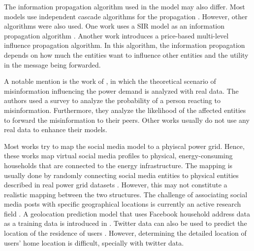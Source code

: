 The information propagation algorithm used in the model may also differ.
Most models use independent cascade algorithms for the propagation
\cite{raman2020weaponizing} \cite{pan2017threat}
\cite{nguyen2019vulnerability}. 
However, other algorithms were also used. One work uses a SIR 
model as an information propagation algorithm 
\cite{jamalzadeh2022protecting}. Another work 
\cite{vulnerabilityanalysis} introduces a price-based multi-level 
influence propagation algorithm. In this algorithm, the information
propagation depends on how much the entities want to influence other
entities and the utility in the message being forwarded. 

A notable mention is the work of \cite{raman2020weaponizing},
in which the theoretical scenario of misinformation influencing 
the power demand is analyzed with real data. The authors 
used a survey to analyze the probability 
of a person reacting to misinformation.
Furthermore, they analyze the likelihood of the affected entities 
to forward the misinformation to their
peers. Other works usually do not use any real data to 
enhance their models.

Most works try to map the social media model to 
a phyiscal power grid. Hence, these works map virtual social 
media profiles to physical, energy-consuming 
households that are connected to the energy infrastructure.
The mapping is usually done by randomly connecting 
social media entities to physical entities described
in real power grid datasets \cite{nguyen2019vulnerability}
\cite{pan2017threat}. However, this may not constitute a realistic 
mapping between the two structures. 
The challenge of 
associating social media posts with specific geographical locations
is currently an active research field \cite{jurgens2015geolocation}.
A geolocation prediction model that 
uses Facebook household address data as a training data 
is introduced in \cite{backstrom2010find}.
Twitter data can also be used to predict the location
of the residence of users \cite{zheng2018survey}.
However, determining the detailed location of 
users' home location is difficult, specially with twitter data.
